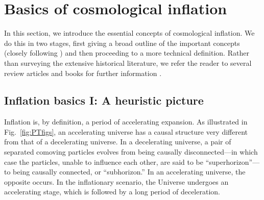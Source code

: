 \section{Basics of cosmological inflation}
\label{sec:basics}

In this section, we introduce the essential concepts of cosmological inflation. We do this in two stages, first giving a broad outline of the important concepts (closely following \cite{Carlstrom:2015cck}) and then proceeding to a more technical definition.  Rather than surveying the extensive historical literature, we refer the reader to several review articles and books for further information
\cite{LythRiotto,LiddleLyth,Mukhanov:2005sc,Baumann:2009ds,Linde:2005dd,EllisWands}.

\subsection{Inflation basics I: A heuristic picture}

Inflation is, by definition, a period of accelerating expansion. As illustrated in Fig.~\ref{fig:PTfigs}, an accelerating universe has a causal structure very different from that of a decelerating universe. In a decelerating universe, a pair of separated comoving particles evolves from being causally disconnected---in which case the particles, unable to influence each other, are said to be ``superhorizon''---to being causally connected, or ``subhorizon.'' In an accelerating universe, the opposite occurs. In the inflationary scenario, the Universe undergoes an accelerating stage, which is followed by a long period of deceleration.


